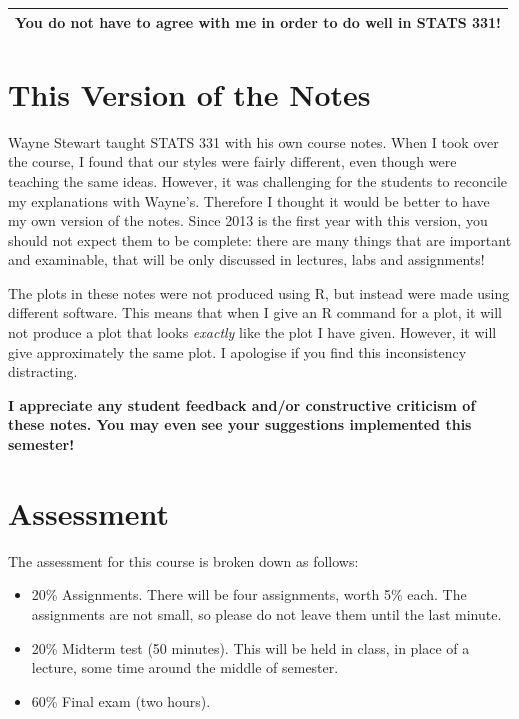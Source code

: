\begin{center}
\begin{tabular}{|c|}
\hline
{\bf You do not have to agree with me in order to do well in STATS 331!}\\
\hline
\end{tabular}
\end{center}

\section{This Version of the Notes}
Wayne Stewart taught STATS 331 with his own course notes. When I took over the
course, I found that our styles were fairly different, even though were teaching
the same ideas. However, it was challenging for the students to reconcile
my explanations with Wayne's. Therefore I thought it would be better to have
my own version of the notes. Since 2013 is the first year with this version, you
should not expect them to be complete: there are many things that are important
and examinable, that will be only discussed in lectures, labs and assignments!

The plots in these notes were not produced using R, but instead were made using
different software. This means that when I give an R command for a plot,
it will not produce a plot that looks {\it exactly} like the plot I have given.
However, it will give approximately the same plot. I apologise if you find this
inconsistency distracting.

\begin{framed}
\begin{center}
{\bf 
I appreciate any student feedback and/or constructive criticism of these notes.
You may even see your suggestions implemented this semester!
}
\end{center}
\end{framed}

\section{Assessment}
The assessment for this course is broken down as follows:
\begin{itemize}
\item 20\% Assignments. There will be four assignments, worth 5\% each. The
assignments are not small, so please do not leave them until the last minute.
\item 20\% Midterm test (50 minutes). This will be held in class, in place of
a lecture, some time around the middle of semester.
\item 60\% Final exam (two hours).
\end{itemize}


